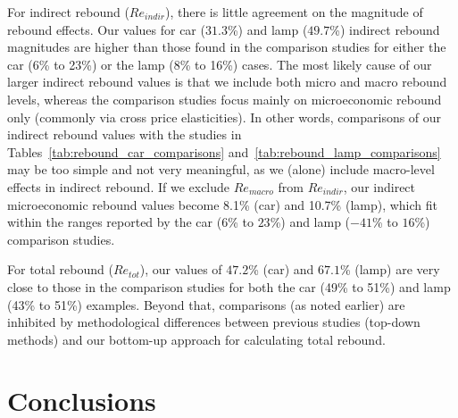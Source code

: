 \documentclass[12pt]{article}\usepackage[]{graphicx}\usepackage[]{xcolor}
\begin{document}
For indirect rebound ($Re_{indir}$),
there is little agreement on the magnitude of rebound effects.
Our values for 
car ($31.3$\%) and 
lamp ($49.7$\%) indirect rebound magnitudes
are higher than those found in the comparison studies
for either the car (6\% to 23\%) or the lamp (8\% to 16\%) cases.
The most likely cause of our larger indirect rebound values
is that we include both micro and macro rebound levels,
whereas the comparison studies 
focus mainly on microeconomic rebound only
(commonly via cross price elasticities).
In other words, 
comparisons of our indirect rebound values with the studies
in Tables~\ref{tab:rebound_car_comparisons} and~\ref{tab:rebound_lamp_comparisons}
may be too simple and not very meaningful,
as we (alone) include macro-level effects in indirect rebound. 
If we exclude $Re_{macro}$ from $Re_{indir}$, 
our indirect microeconomic rebound values become 
8.1\% (car) and
10.7\% (lamp),
which fit within the ranges reported by the
car ($6$\% to $23$\%) and lamp ($-41$\% to $16$\%)
comparison studies.

For total rebound ($Re_{tot}$),
our values of
$47.2$\% (car) and
$67.1$\% (lamp)
are very close to those in the comparison studies for both the car (49\% to 51\%) and
lamp (43\% to 51\%) examples.
Beyond that, comparisons (as noted earlier) are inhibited
by methodological differences between previous studies (top-down methods)
and our bottom-up approach for calculating total rebound.


\section{Conclusions}
\label{sec:conclusion}
\end{document}
